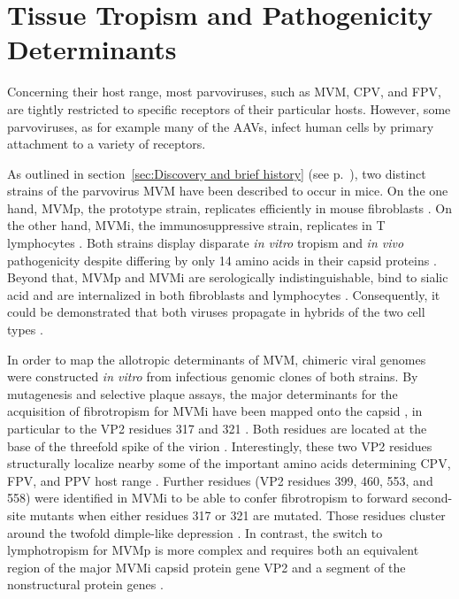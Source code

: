 
\newpage

\section{Tissue Tropism and Pathogenicity Determinants}
Concerning their host range, most parvoviruses, such as MVM,  CPV,  and FPV,  are tightly restricted to specific receptors of their particular hosts. However, some parvoviruses, as for example many of the AAVs,  infect human cells by primary attachment to a variety of receptors. 

As outlined in section~\ref{sec:Discovery and brief history} (see p.~\pageref{sec:Discovery and brief history}), two distinct strains of the parvovirus MVM have been described to occur in mice. On the one hand, MVMp,  the prototype strain, replicates efficiently in mouse fibroblasts \cite{pmid5945715}. On the other hand, MVMi, the immunosuppressive strain, replicates in T lymphocytes \cite{pmid1244418}.
Both strains display disparate \textit{in vitro} tropism and \textit{in vivo} pathogenicity despite differing by only 14 amino acids in their capsid proteins \cite{pmid1871965}. Beyond that, MVMp and MVMi are serologically indistinguishable, bind to sialic acid and are internalized in both fibroblasts and lymphocytes \cite{pmid6602221}. Consequently, it could be demonstrated that both viruses propagate in hybrids of the two cell types \cite{pmid6602222}.    

In order to map the allotropic determinants of MVM, chimeric viral genomes were constructed \textit{in vitro} from infectious genomic clones of both strains. By mutagenesis and selective plaque assays, the major determinants for the acquisition of fibrotropism for MVMi have been mapped onto the capsid \cite{pmid3257270, pmid9519837, pmid1871965}, in particular to the VP2 residues 317 and 321 \cite{pmid7637028, pmid1316457}. Both residues are located at the base of the threefold spike of the virion \cite{pmid3357208, pmid3392768, pmid3257270}. Interestingly, these two VP2 residues structurally localize nearby some of the important amino acids determining CPV, FPV, and PPV host range \cite{pmid14581558, pmid12941920, pmid1532105}. Further residues (VP2 residues 399, 460, 553, and 558) were identified in MVMi to be able to confer fibrotropism to forward second-site mutants when either residues 317 or 321 are mutated. Those residues cluster around the twofold dimple-like depression \cite{pmid9817841}. In contrast, the switch to lymphotropism for MVMp is more complex and requires both an equivalent region of the major MVMi capsid protein gene VP2 and a segment of the nonstructural protein genes \cite{pmid9519837}.    

